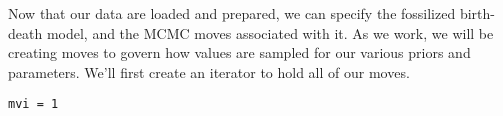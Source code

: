 %
%
%
%
%
%
%

Now that our data are loaded and prepared, we can specify the fossilized birth-death model, and the MCMC moves associated with it. As we work, we will be creating moves to govern how values are sampled for our various priors and parameters. We'll first create an iterator to hold all of our moves.

{\tt \begin{snugshade*}
\begin{lstlisting}
mvi = 1
\end{lstlisting}
\end{snugshade*}}

